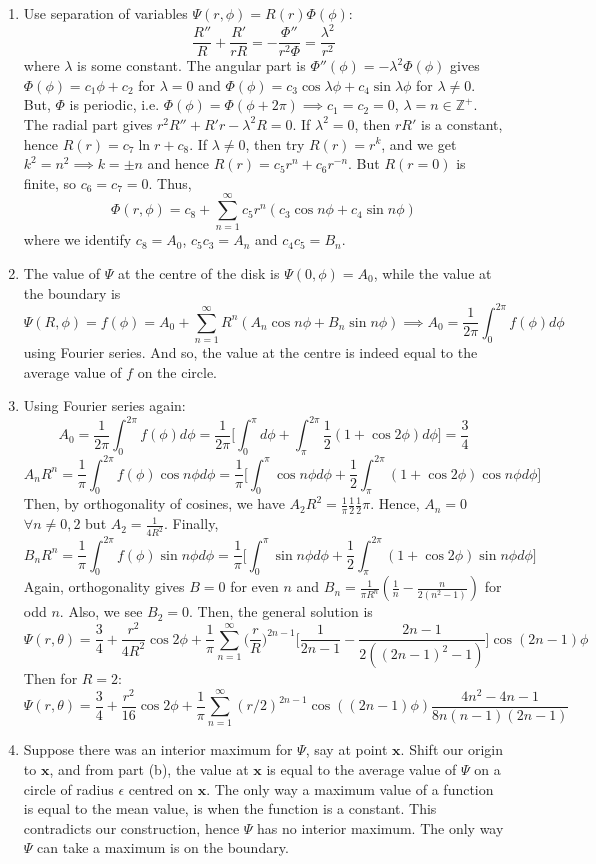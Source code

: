 \documentclass[a4paper]{article}
\begin{document}
\begin{ans}\leavevmode
\begin{enumerate}[label=(\alph*)]
\item Use separation of variables $\Psi(r,\phi)=R(r)\Phi(\phi)$:
$$\frac{R''}{R}+\frac{R'}{rR}=-\frac{\Phi''}{r^2\Phi}=\frac{\lambda^2}{r^2}$$
where $\lambda$ is some constant. The angular part is $\Phi''(\phi)=-\lambda^2\Phi(\phi)$ gives $\Phi(\phi)=c_1\phi+c_2$ for $\lambda=0$ and $\Phi(\phi)=c_3\cos\lambda\phi+c_4\sin\lambda\phi$ for $\lambda\neq 0$. But, $\Phi$ is periodic, i.e. $\Phi(\phi)=\Phi(\phi+2\pi)\implies c_1=c_2=0$, $\lambda=n\in\mathbb{Z}^+$.\\[5pt]
The radial part gives $r^2R''+R'r-\lambda^2R=0$. If $\lambda^2=0$, then $rR'$ is a constant, hence $R(r)=c_7\ln r+c_8$. If $\lambda\neq 0$, then try $R(r)=r^k$, and we get $k^2=n^2\implies k=\pm n$ and hence $R(r)=c_5r^n+c_6r^{-n}$. But $R(r=0)$ is finite, so $c_6=c_7=0$. Thus,
$$\Phi(r,\phi)=c_8+\sum_{n=1}^\infty c_5r^n(c_3\cos n\phi+c_4\sin n\phi)$$
where we identify $c_8=A_0$, $c_5c_3=A_n$ and $c_4c_5=B_n$.
\item The value of $\Psi$ at the centre of the disk is $\Psi(0,\phi)=A_0$, while the value at the boundary is 
$$\Psi(R,\phi)=f(\phi)=A_0+\sum_{n=1}^\infty R^n(A_n\cos n\phi+B_n\sin n\phi)\implies A_0=\frac{1}{2\pi}\int_0^{2\pi} f(\phi)d\phi$$
using Fourier series. And so, the value at the centre is indeed equal to the average value of $f$ on the circle.
\item Using Fourier series again:
$$A_0=\frac{1}{2\pi}\int_0^{2\pi} f(\phi)d\phi=\frac{1}{2\pi}\bigg[\int_0^\pi d\phi+\int_\pi^{2\pi}\frac{1}{2}(1+\cos 2\phi)d\phi\bigg]=\frac{3}{4}$$
$$A_nR^n=\frac{1}{\pi}\int_0^{2\pi}f(\phi)\cos n\phi d\phi=\frac{1}{\pi}\bigg[\int_0^\pi \cos n\phi d\phi+\frac{1}{2}\int_\pi^{2\pi}(1+\cos 2\phi)\cos n\phi d\phi\bigg]$$
Then, by orthogonality of cosines, we have $A_2R^2=\frac{1}{\pi}\frac{1}{2}\frac{1}{2}\pi$. Hence, $A_n=0$ $\forall n\neq 0,2$ but $A_2=\frac{1}{4R^2}$. Finally,
$$B_nR^n=\frac{1}{\pi}\int_0^{2\pi}f(\phi)\sin n\phi d\phi=\frac{1}{\pi}\bigg[\int_0^\pi \sin n\phi d\phi+\frac{1}{2}\int_\pi^{2\pi}(1+\cos 2\phi)\sin n\phi d\phi\bigg]$$
Again, orthogonality gives $B=0$ for even $n$ and $B_n=\frac{1}{\pi R^n}(\frac{1}{n}-\frac{n}{2(n^2-1)})$ for odd $n$. Also, we see $B_2=0$. Then, the general solution is 
$$\Psi(r,\theta)=\frac{3}{4}+\frac{r^2}{4R^2}\cos 2\phi+\frac{1}{\pi}\sum_{n=1}^\infty\bigg(\frac{r}{R}\bigg)^{2n-1}\bigg[\frac{1}{2n-1}-\frac{2n-1}{2((2n-1)^2-1)}\bigg]\cos(2n-1)\phi$$
Then for $R=2$:
$$\Psi(r,\theta)=\frac{3}{4}+\frac{r^2}{16}\cos 2\phi+\frac{1}{\pi}\sum_{n=1}^\infty(r/2)^{2n-1}\cos((2n-1)\phi)\frac{4n^2-4n-1}{8n(n-1)(2n-1)}$$
\item Suppose there was an interior maximum for $\Psi$, say at point $\mathbf{x}$. Shift our origin to $\mathbf{x}$, and from part (b), the value at $\mathbf{x}$ is equal to the average value of $\Psi$ on a circle of radius $\epsilon$ centred on $\mathbf{x}$. The only way a maximum value of a function is equal to the mean value, is when the function is a constant. This contradicts our construction, hence $\Psi$ has no interior maximum. The only way $\Psi$ can take a maximum is on the boundary.
\end{enumerate}
\end{ans}
\end{document}
